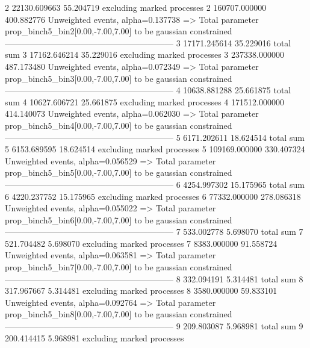 2          22130.609663    55.204719       excluding marked processes    
2          160707.000000   400.882776      Unweighted events, alpha=0.137738
  => Total parameter prop_binch5_bin2[0.00,-7.00,7.00] to be gaussian constrained
------------------------------------------------------------
3          17171.245614    35.229016       total sum                     
3          17162.646214    35.229016       excluding marked processes    
3          237338.000000   487.173480      Unweighted events, alpha=0.072349
  => Total parameter prop_binch5_bin3[0.00,-7.00,7.00] to be gaussian constrained
------------------------------------------------------------
4          10638.881288    25.661875       total sum                     
4          10627.606721    25.661875       excluding marked processes    
4          171512.000000   414.140073      Unweighted events, alpha=0.062030
  => Total parameter prop_binch5_bin4[0.00,-7.00,7.00] to be gaussian constrained
------------------------------------------------------------
5          6171.202611     18.624514       total sum                     
5          6153.689595     18.624514       excluding marked processes    
5          109169.000000   330.407324      Unweighted events, alpha=0.056529
  => Total parameter prop_binch5_bin5[0.00,-7.00,7.00] to be gaussian constrained
------------------------------------------------------------
6          4254.997302     15.175965       total sum                     
6          4220.237752     15.175965       excluding marked processes    
6          77332.000000    278.086318      Unweighted events, alpha=0.055022
  => Total parameter prop_binch5_bin6[0.00,-7.00,7.00] to be gaussian constrained
------------------------------------------------------------
7          533.002778      5.698070        total sum                     
7          521.704482      5.698070        excluding marked processes    
7          8383.000000     91.558724       Unweighted events, alpha=0.063581
  => Total parameter prop_binch5_bin7[0.00,-7.00,7.00] to be gaussian constrained
------------------------------------------------------------
8          332.094191      5.314481        total sum                     
8          317.967667      5.314481        excluding marked processes    
8          3580.000000     59.833101       Unweighted events, alpha=0.092764
  => Total parameter prop_binch5_bin8[0.00,-7.00,7.00] to be gaussian constrained
------------------------------------------------------------
9          209.803087      5.968981        total sum                     
9          200.414415      5.968981        excluding marked processes    
